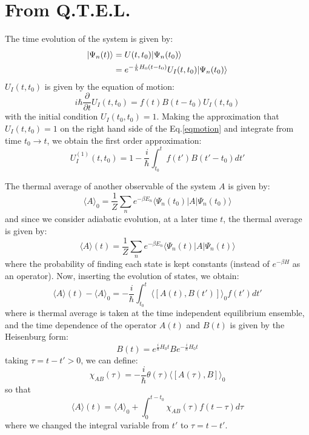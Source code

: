 \documentclass{article}
\begin{document}
\section{From Q.T.E.L.}
The time evolution of the system is given by:
\begin{align}
    | \Psi_n(t) \rangle &= U(t,t_0) | \Psi_n(t_0) \rangle \notag \\
                     &= e^{-\frac{i}{\hbar}H_0(t-t_0)} U_I(t,t_0) | \Psi_n(t_0) \rangle \notag 
\end{align}
$U_I(t,t_0)$ is given by the equation of motion:
\begin{equation}
    i\hbar \frac{\partial}{\partial t} U_I(t,t_0) = f(t) B(t-t_0) U_I(t,t_0) \label{eqmotion}
\end{equation}
with the initial condition $U_I(t_0,t_0) = 1$. Making the approximation that $U_I(t,t_0) = 1$ on the 
right hand side of the Eq.\ref{eqmotion} and integrate from time $t_0 \to t$, we obtain the first order approximation:
\begin{equation}
    U_I^{(1)}(t,t_0) = 1 - \frac{i}{\hbar} \int_{t_0}^{t} f(t') B(t'-t_0) dt'
\end{equation}

The thermal average of another observable of the system $A$ is given by:
\begin{equation}
    \langle A\rangle_0 = \frac{1}{Z} \sum_n e^{-\beta E_n} \langle \Psi_n(t_0) | A | \Psi_n(t_0) \rangle 
\end{equation}
and since we consider adiabatic evolution, at a later time $t$, the thermal average is 
given by:
\begin{equation}
    \langle A\rangle(t) = \frac{1}{Z} \sum_n e^{-\beta E_n} \langle \Psi_n(t) | A | \Psi_n(t) \rangle 
\end{equation}
where the probability of finding each state is kept constants (instead of $e^{-\beta H}$ as an operator).
Now, inserting the evolution of states, we obtain:
\begin{equation}
    \langle A\rangle(t) - \langle A\rangle_0 = -\frac{i}{\hbar} \int_{t_0}^{t} \langle [ A(t), B(t') ] \rangle_0 f(t') dt'
\end{equation} 
where is thermal average is taken at the time independent equilibrium ensemble, and the time dependence of
the operator $A(t)$ and $B(t)$ is given by the Heisenburg form:
\begin{equation}
    B(t) = e^{\frac{i}{\hbar}H_0t} B e^{-\frac{i}{\hbar}H_0t}
\end{equation}
taking $\tau = t - t' > 0$, we can define:
\begin{equation}
    \chi_{AB}(\tau) = -\frac{i}{\hbar} \theta(\tau) \langle [ A(\tau), B ] \rangle_0 \label{responsefunction}
\end{equation}
so that 
\begin{equation}
    \langle A\rangle(t) = \langle A\rangle_0 + \int_{0}^{t-t_0} \chi_{AB}(\tau) f(t - \tau) d\tau
\end{equation} 
where we changed the integral variable from $t'$ to $\tau = t - t'$. 
\end{document}
